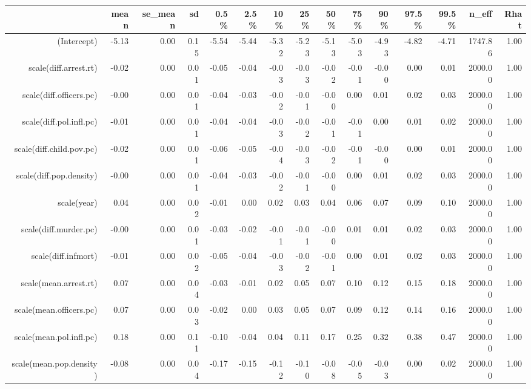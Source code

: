 \begin{table}[ht]
\centering
\begin{tabular}{rrrrrrrrrrrrrrr}
  \hline
 & mean & se\_mean & sd & 0.5\% & 2.5\% & 10\% & 25\% & 50\% & 75\% & 90\% & 97.5\% & 99.5\% & n\_eff & Rhat \\ 
  \hline
(Intercept) & -5.13 & 0.00 & 0.15 & -5.54 & -5.44 & -5.32 & -5.23 & -5.13 & -5.03 & -4.93 & -4.82 & -4.71 & 1747.86 & 1.00 \\ 
  scale(diff.arrest.rt) & -0.02 & 0.00 & 0.01 & -0.05 & -0.04 & -0.03 & -0.03 & -0.02 & -0.01 & -0.00 & 0.00 & 0.01 & 2000.00 & 1.00 \\ 
  scale(diff.officers.pc) & -0.00 & 0.00 & 0.01 & -0.04 & -0.03 & -0.02 & -0.01 & -0.00 & 0.00 & 0.01 & 0.02 & 0.03 & 2000.00 & 1.00 \\ 
  scale(diff.pol.infl.pc) & -0.01 & 0.00 & 0.01 & -0.04 & -0.04 & -0.03 & -0.02 & -0.01 & -0.01 & 0.00 & 0.01 & 0.02 & 2000.00 & 1.00 \\ 
  scale(diff.child.pov.pc) & -0.02 & 0.00 & 0.01 & -0.06 & -0.05 & -0.04 & -0.03 & -0.02 & -0.01 & -0.00 & 0.00 & 0.01 & 2000.00 & 1.00 \\ 
  scale(diff.pop.density) & -0.00 & 0.00 & 0.01 & -0.04 & -0.03 & -0.02 & -0.01 & -0.00 & 0.00 & 0.01 & 0.02 & 0.03 & 2000.00 & 1.00 \\ 
  scale(year) & 0.04 & 0.00 & 0.02 & -0.01 & 0.00 & 0.02 & 0.03 & 0.04 & 0.06 & 0.07 & 0.09 & 0.10 & 2000.00 & 1.00 \\ 
  scale(diff.murder.pc) & -0.00 & 0.00 & 0.01 & -0.03 & -0.02 & -0.01 & -0.01 & -0.00 & 0.01 & 0.01 & 0.02 & 0.03 & 2000.00 & 1.00 \\ 
  scale(diff.infmort) & -0.01 & 0.00 & 0.02 & -0.05 & -0.04 & -0.03 & -0.02 & -0.01 & 0.00 & 0.01 & 0.02 & 0.03 & 2000.00 & 1.00 \\ 
  scale(mean.arrest.rt) & 0.07 & 0.00 & 0.04 & -0.03 & -0.01 & 0.02 & 0.05 & 0.07 & 0.10 & 0.12 & 0.15 & 0.18 & 2000.00 & 1.00 \\ 
  scale(mean.officers.pc) & 0.07 & 0.00 & 0.03 & -0.02 & 0.00 & 0.03 & 0.05 & 0.07 & 0.09 & 0.12 & 0.14 & 0.16 & 2000.00 & 1.00 \\ 
  scale(mean.pol.infl.pc) & 0.18 & 0.00 & 0.11 & -0.10 & -0.04 & 0.04 & 0.11 & 0.17 & 0.25 & 0.32 & 0.38 & 0.47 & 2000.00 & 1.00 \\ 
  scale(mean.pop.density) & -0.08 & 0.00 & 0.04 & -0.17 & -0.15 & -0.12 & -0.10 & -0.08 & -0.05 & -0.03 & 0.00 & 0.02 & 2000.00 & 1.00 \\ 

\end{tabular}
\end{table}
